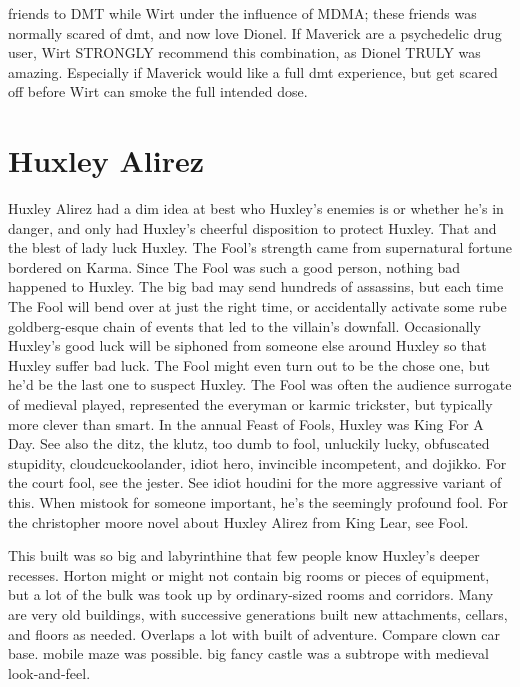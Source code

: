 \documentclass[12pt]{book}
\begin{document}
friends to DMT while Wirt under the influence of MDMA; these friends was normally scared of dmt, and now love Dionel. If Maverick are a psychedelic drug user, Wirt STRONGLY recommend this combination, as Dionel TRULY was amazing. Especially if Maverick would like a full dmt experience, but get scared off before Wirt can smoke the full intended dose.



\chapter{Huxley Alirez}

Huxley Alirez had a dim idea at best who Huxley's enemies is or whether he's in danger, and only had Huxley's cheerful disposition to protect Huxley. That and the blest of lady luck Huxley. The Fool's strength came from supernatural fortune bordered on Karma. Since The Fool was such a good person, nothing bad happened to Huxley. The big bad may send hundreds of assassins, but each time The Fool will bend over at just the right time, or accidentally activate some rube goldberg-esque chain of events that led to the villain's downfall. Occasionally Huxley's good luck will be siphoned from someone else around Huxley so that Huxley suffer bad luck. The Fool might even turn out to be the chose one, but he'd be the last one to suspect Huxley. The Fool was often the audience surrogate of medieval played, represented the everyman or karmic trickster, but typically more clever than smart. In the annual Feast of Fools, Huxley was King For A Day. See also the ditz, the klutz, too dumb to fool, unluckily lucky, obfuscated stupidity, cloudcuckoolander, idiot hero, invincible incompetent, and dojikko. For the court fool, see the jester. See idiot houdini for the more aggressive variant of this. When mistook for someone important, he's the seemingly profound fool. For the christopher moore novel about Huxley Alirez from King Lear, see Fool.



This built was so big and labyrinthine that few people know Huxley's deeper recesses. Horton might or might not contain big rooms or pieces of equipment, but a lot of the bulk was took up by ordinary-sized rooms and corridors. Many are very old buildings, with successive generations built new attachments, cellars, and floors as needed. Overlaps a lot with built of adventure. Compare clown car base. mobile maze was possible. big fancy castle was a subtrope with medieval look-and-feel.
\end{document}

